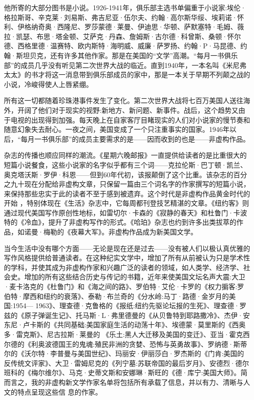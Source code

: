 他所寄的大部分图书是小说。1926-1941年，俱乐部主选书单偏重于小说家:埃伦·格拉斯哥、辛克莱·刘易斯、弗吉尼亚·伍尔夫、约翰·高尔斯华绥、埃莉诺·怀利、伊格纳奇奥·西隆尼、罗莎蒙德·莱曼、伊迪思·华顿、萨默塞特·毛姆、薇拉·凯瑟、布思·塔金顿、艾萨克·丹森、詹姆斯·古尔德·科曾斯、桑顿·怀尔德、西格里德·温赛特、欧内斯特·海明威、威廉·萨罗扬、约翰·P·马昆德、约翰·斯坦贝克，还有许多其他作家。那是在美国的“文学”高潮。“每月一书俱乐部”的成员几乎没有听见第二次世界大战的临近。直到1940年，一本名叫《米尼弗太太》的书才将这一消息带到俱乐部成员的家中，那是一本关于早期不列颠之战的小说，冷峻得使人上唇紧绷。

所有这一切都随着珍珠港事件发生了变化。第二次世界大战将七百万美国人送往海外，开阔了他们对于现实的视野:新地方、新问题、新事件。战后，这个趋势又由于电视的出现得到加强。每天晚上在自家客厅目睹现实的人们对小说家的慢节奏和随意幻象失去耐心。一夜之间，美国变成了一个只注重事实的国家。1946年以后，“每月一书俱乐部”的成员主要需求的是——因而收到的也是——非虚构作品。

杂志的传播也顺应同样的潮流。《星期六晚邮报》一直提供给读者的是比重很大的短篇小说餐食，这些小说家的名字似乎都有三个词——克拉伦斯·巴丁顿·凯兰、奥克塔沃斯·罗伊·科恩——但到60年代初，该报颠倒了这个比重。该杂志的百分之九十现在分配给非虚构文章，只保留一篇由三个词名字的作家撰写的短篇小说，来保持那些忠实于此的读者不至于感到被遗弃。这个时代是非虚构作品黄金时代的开始 ，特别体现在《生活》杂志中，它每周都刊登技艺精湛的文章。《纽约客》则通过现代美国写作原创性地标，如雷切尔·卡森的《寂静的春天》和杜鲁门·卡波特的《冷血》，提升了非虚构写作的形式。《哈珀》杂志也约到许多出类拔萃的作品，如诺曼·梅勒的《夜幕大军》。非虚构作品成为新美国文学。

当今生活中没有哪个方面——无论是现在还是过去——没有被人们以极认真优雅的写作风格提供给普通读者。在这种纪实文学中，增加了所有从前被认为只是学术性的学科，并使其成为非虚构作家和兴趣广泛的读者的领域，如人类学、经济学、社会史。增加的所有这些结合历史与传记的书籍，近年来使美国文坛名声大震:大卫·麦卡洛克的《杜鲁门》和《海之间的路》、罗伯特·艾伦·卡罗的《权力掮客:罗伯特·摩西和纽约的衰落》、泰勒·布兰奇的《分水岭:马丁·路德·金岁月的美国:1954— 1963》、理查德·克鲁格的《报纸:纽约先驱论坛报的生死》、理查德·罗兹的《原子弹诞生记》、托马斯·L·弗里德曼的《从贝鲁特到耶路撒冷》、杰伊·安东尼·卢卡斯的《共同基础:美国家庭生活的动荡十年》、埃德蒙·莫里斯的《西奥多·雷克斯》、尼古拉斯·莱曼的 《乐土:黑人大迁移及美国的变迁》、亚当·霍克西尔德的《利奥波德国王的鬼魂:殖民非洲的贪婪、恐怖与英勇故事》、罗纳德·斯蒂尔的《沃尔特·李普曼与美国世纪》、玛丽安·伊丽莎白·罗杰斯的《门肯:美国的反传统文评家》、大卫·雷姆尼克的《列宁墓:苏联帝国的最后岁月》、安德烈·德尔班科的《梅尔维尔》、马克·史蒂文斯和安娜琳·斯旺的《德·库宁:美国大师》。简而言之，我的非虚构新文学作家名单将包括所有承载了信息，并以有力、清晰与人文的特点呈现这些信
息的作家。

